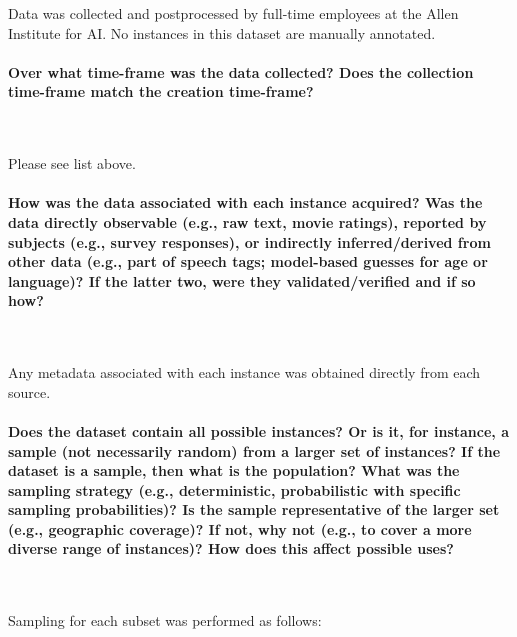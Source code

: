 Data was collected and postprocessed by full-time employees at the Allen Institute for AI. No instances in this dataset are manually annotated.

\paragraph{Over what time-frame was the data collected? Does the collection time-frame match the creation time-frame?}~

Please see list above. 

\paragraph{How was the data associated with each instance acquired? Was the data directly observable (e.g., raw text, movie ratings), reported by subjects (e.g., survey responses), or indirectly inferred/derived from other data (e.g., part of speech tags; model-based guesses for age or language)? If the latter two, were they validated/verified and if so how?}~


Any metadata associated with each instance was obtained directly from each source. 


\paragraph{Does the dataset contain all possible instances? Or is it, for instance, a sample (not necessarily random) from a larger set of instances? 
If the dataset is a sample, then what is the population? What was the sampling strategy (e.g., deterministic, probabilistic with specific sampling probabilities)? Is the sample representative of the larger set (e.g., geographic coverage)? If not, why not (e.g., to cover a more diverse range of instances)? How does this affect possible uses?}~

Sampling for each subset was performed as follows:

